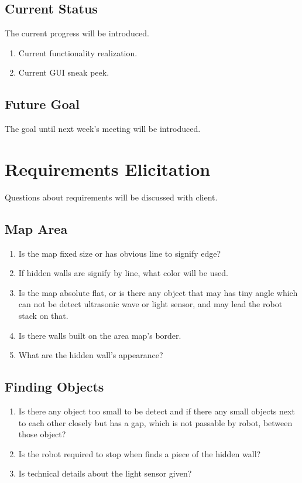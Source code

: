 \documentclass[11pt, a4paper]{article}
\begin{document}
\subsection{Current Status}
The current progress will be introduced. 
\begin{enumerate}
\item Current functionality realization.
\item Current GUI sneak peek.
\end{enumerate}
\subsection{Future Goal}
The goal until next week's meeting will be introduced. 


\section{Requirements Elicitation}
Questions about requirements will be discussed with client. 
\subsection{Map Area}
\begin{enumerate}
\item Is the map fixed size or has obvious line to signify edge? 
\item If hidden walls are signify by line, what color will be used.
\item Is the map absolute flat, or is there any object that may has tiny angle which can not be detect ultrasonic wave or light sensor, and may lead the robot stack on that. 
\item Is there walls built on the area map's border. 
\item What are the hidden wall's appearance?
\end{enumerate}

\subsection{Finding Objects}
\begin{enumerate}
\item Is there any object too small to be detect and if there any small objects next to each other closely but has a gap, which is not passable by robot, between those object? 
\item Is the robot required to stop when finds a piece of the hidden wall?
\item Is technical details about the light sensor given?
\end{enumerate}
\end{document}
